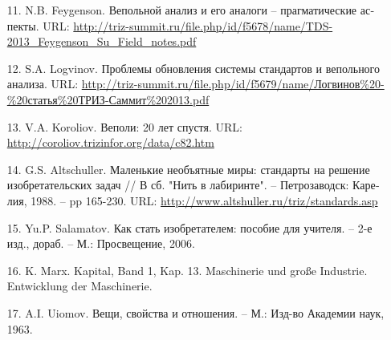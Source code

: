 \documentclass[11pt,a4paper]{article}
\begin{document}
\begin{itemize}
\item[11.] N.B. Feygenson.  \foreignlanguage{russian}{Вепольной анализ и его
  аналоги – прагматические аспекты}. URL:
  \url{http://triz-summit.ru/file.php/id/f5678/name/TDS-2013_Feygenson_Su_Field_notes.pdf}
\item[12.] S.A. Logvinov. \foreignlanguage{russian}{Проблемы обновления
  системы стандартов и вепольного анализа}. URL:
  \url{http://triz-summit.ru/file.php/id/f5679/name/Логвинов%20-%20статья%20ТРИЗ-Саммит%202013.pdf}
\item[13.] V.A. Koroliov. \foreignlanguage{russian}{Веполи: 20 лет спустя}.
  URL: \url{http://coroliov.trizinfor.org/data/c82.htm}
\item[14.] G.S. Altschuller. \foreignlanguage{russian}{Маленькие необъятные
  миры: стандарты на решение изобретательских задач // В сб. "Нить в
  лабиринте". – Петрозаводск: Карелия, 1988}. – pp 165-230. URL:
  \url{http://www.altshuller.ru/triz/standards.asp}
\item[15.] Yu.P. Salamatov. \foreignlanguage{russian}{Как стать изобретателем:
  пособие для учителя. – 2-е изд., дораб. – М.: Просвещение}, 2006.
\item[16.] K. Marx. Kapital, Band 1, Kap. 13. Maschinerie und große Industrie.
  Entwicklung der Maschinerie.
\item[17.] A.I. Uiomov. \foreignlanguage{russian}{Вещи, свойства и
  отношения. – М.: Изд-во Академии наук,} 1963.
\end{itemize}
\end{document}
